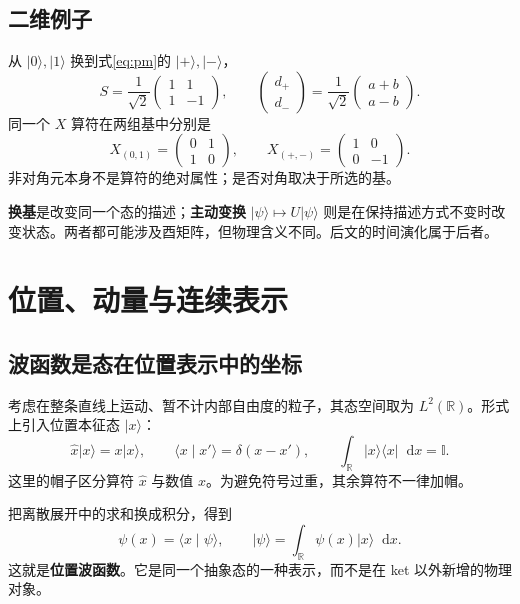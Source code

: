 \documentclass[a4paper,11pt]{article}
\numberwithin{equation}{section}
\newcommand{\dd}{\mathop{}\!\mathrm{d}}
\newcommand{\I}{\mathbb I}
\newcommand{\ket}[1]{\lvert #1\rangle}
\newcommand{\bra}[1]{\langle #1\rvert}
\newcommand{\braket}[2]{\langle #1\mid #2\rangle}
\begin{document}
\subsection{二维例子}
从 $\ket{0},\ket{1}$ 换到式\eqref{eq:pm}的 $\ket{+},\ket{-}$，
\begin{equation}
  S=\frac1{\sqrt2}\begin{pmatrix}1&1\\1&-1\end{pmatrix},
  \qquad
  \begin{pmatrix}d_+\\d_-\end{pmatrix}
  =\frac1{\sqrt2}\begin{pmatrix}a+b\\a-b\end{pmatrix}.
\end{equation}
同一个 $X$ 算符在两组基中分别是
\[
  X_{(0,1)}=\begin{pmatrix}0&1\\1&0\end{pmatrix},\qquad
  X_{(+,-)}=\begin{pmatrix}1&0\\0&-1\end{pmatrix}.
\]
非对角元本身不是算符的绝对属性；是否对角取决于所选的基。

\textbf{换基}是改变同一个态的描述；\textbf{主动变换} $\ket{\psi}\mapsto U\ket{\psi}$ 则是在保持描述方式不变时改变状态。两者都可能涉及酉矩阵，但物理含义不同。后文的时间演化属于后者。

\section{位置、动量与连续表示}
\subsection{波函数是态在位置表示中的坐标}
考虑在整条直线上运动、暂不计内部自由度的粒子，其态空间取为 $L^2(\mathbb R)$。形式上引入位置本征态 $\ket{x}$：
\begin{equation}\label{eq:positionbasis}
  \hat x\ket{x}=x\ket{x},\qquad
  \braket{x}{x'}=\delta(x-x'),\qquad
  \int_{\mathbb R}\ket{x}\bra{x}\dd x=\I.
\end{equation}
这里的帽子区分算符 $\hat x$ 与数值 $x$。为避免符号过重，其余算符不一律加帽。

把离散展开中的求和换成积分，得到
\begin{equation}\label{eq:wavefunction}
  \boxed{\psi(x)=\braket{x}{\psi},\qquad
  \ket{\psi}=\int_{\mathbb R}\psi(x)\ket{x}\dd x.}
\end{equation}
这就是\textbf{位置波函数}。它是同一个抽象态的一种表示，而不是在 ket 以外新增的物理对象。
\end{document}
